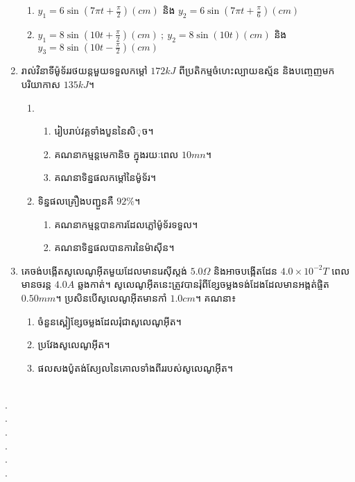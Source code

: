 \documentclass{officialexam}
\begin{document}
\begin{enumerate}[I]
\begin{enumerate}[k]
		\item $y_1=6\sin\left(7\pi t + \frac{\pi}{2}\right)\left(cm\right)$ និង $y_2=6\sin\left(7\pi t + \frac{\pi}{6}\right)​\left(cm\right)$
		\item  $y_1=8\sin\left(10t + \frac{\pi}{2}\right)\left(cm\right)~;~y_2=8\sin\left(10t\right)\left(cm\right)$ និង $y_3=8\sin\left(10t - \frac{\pi}{2}\right)\left(cm\right)$
	\end{enumerate}
	\item រាល់វិនាទីម៉ូទ័ររថយន្តមួយទទួលកម្តៅ $172kJ$ ពីប្រតិកម្មចំហេះល្បាយឧស្ម័ន និងបញ្ចេញមកបរិយាកាស $135kJ$។
	\begin{enumerate}[m]
		\item \begin{enumerate}[k]
			\item រៀបរាប់វគ្គទាំងបួននៃសិុច។
			\item គណនាកម្មន្តមេកានិច ក្នុងរយៈពេល $10mn$។
			\item គណនាទិន្នផលកម្តៅនៃម៉ូទ័រ។ 
		\end{enumerate}
		\item ទិន្នផលគ្រឿងបញ្ជួនគឺ $92\%$។
		\begin{enumerate}[k]
			\item គណនាកម្មន្តបានការដែលភ្លៅម៉ូទ័រទទួល។
			\item គណនាទិន្នផលបានការនៃម៉ាសុីន។
		\end{enumerate}
	\end{enumerate}\newpage
	\item គេចង់បង្កើតសូលេណូអុីតមួយដែលមានរេសុីស្តង់ $5.0\Omega$ និងអាចបង្កើតដែន $4.0\times10^{-2}T$ ពេលមានចរន្ត $4.0A$ ឆ្លងកាត់។ សូលេណូអុីតនេះត្រូវបានរុំពីខ្សែចម្លងទង់ដែងដែលមានអង្កត់ផ្ចិត $0.50mm$។ ប្រសិនបើសូលេណូអុីតមានកាំ $1.0cm$។ គណនា៖
	\begin{enumerate}[k]
		\item ចំនួនស្ពៀខ្សែចម្លងដែលរុំជាសូលេណូអុីត។
		\item ប្រវែងសូលេណូអុីត។
		\item ផលសងប៉ូតង់ស្យែលនៃគោលទាំងពីររបស់សូលេណូអុីត។
	\end{enumerate}
\end{enumerate}
\\
{\color{white}.}\dotfill\\
{\color{white}.}\dotfill\\
{\color{white}.}\dotfill
\\
{\color{white}.}\dotfill\\
{\color{white}.}\dotfill\\
{\color{white}.}\dotfill
\end{document}
